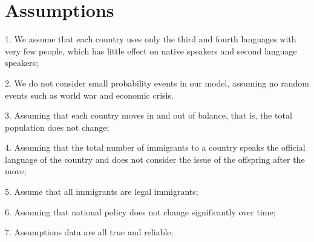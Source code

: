 \section{Assumptions}
1. We assume that each country uses only the third and fourth languages with very few people, which has little effect on native speakers and second language speakers;

2. We do not consider small probability events in our model, assuming no random events such as world war and economic crisis.

3. Assuming that each country moves in and out of balance, that is, the total population does not change;

4. Assuming that the total number of immigrants to a country speaks the official language of the country and does not consider the issue of the offspring after the move;

5. Assume that all immigrants are legal immigrants;

6. Assuming that national policy does not change significantly over time;

7. Assumptions data are all true and reliable;


